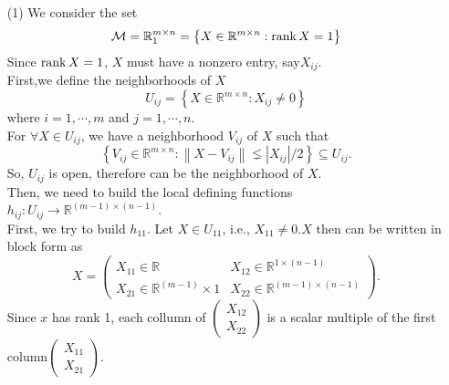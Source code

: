 \documentclass[en, oneside]{assignment}
\begin{document}
\begin{sol}
    \begin{itemize}
        \item[(1)] We consider the set
        \begin{equation*}
            \mathcal{M} = \mathbb{R}^{m \times n}_1 = \left\{X \in \mathbb{R}^{m \times n}: \operatorname{rank}{X} = 1\right\} 
        \end{equation*}
        Since $\operatorname{rank}{X} = 1$, $X$ must have a nonzero entry, say$X_{ij}$.\\
        First,we define the neighborhoods of $X$
        \begin{equation*}
            U_{ij} = \left\{X \in \mathbb{R}^{m \times n}: X_{ij} \neq 0\right\}
        \end{equation*}
        where $i = 1, \cdots, m$ and $j = 1, \cdots, n$.\\
        For $\forall X \in U_{ij}$, we have a neighborhood $V_{ij}$ of $X$ such that
        \begin{equation*}
            \left\{V_{ij} \in \mathbb{R}^{m \times n}: \left\lVert X - V_{ij}\right\rVert \lneq \left\lvert X_{ij}\right\rvert / 2 \right\} \subseteq U_{ij}.
        \end{equation*}
        So, $U_{ij}$ is open, therefore can  be the neighborhood of $X$.\\
        Then, we need to build the local defining functions $h_{ij}: U_{ij} \to \mathbb{R}^{(m-1) \times (n-1)}$.\\
        First, we try to build $h_{11}$. Let $X \in U_{11}$, i.e., $X_{11} \neq 0$.$X$ then can be written in block form as
        \begin{equation*}
            X = \begin{pmatrix}
                X_{11} \in \mathbb{R} & X_{12} \in \mathbb{R}^{1 \times (n-1)}\\
                X_{21} \in \mathbb{R}^{(m-1)} \times 1 & X_{22} \in \mathbb{R}^{(m-1) \times (n-1)}
            \end{pmatrix}.
        \end{equation*}
        Since $x$ has rank 1, each collumn of $\begin{pmatrix}X_{12}\\X_{22}\end{pmatrix}$ 
        is a scalar multiple of the first column$\begin{pmatrix}X_{11}\\X_{21}\end{pmatrix}$.\\

\end{itemize}
\end{sol}
\end{document}
